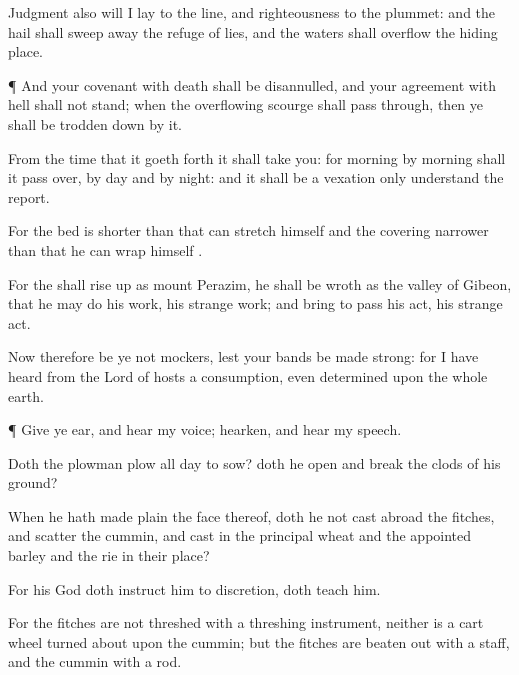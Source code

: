 {Judgment also will I
lay to the
line, and
righteousness to the
plummet: and the
hail shall sweep
away the
refuge of
lies, and the
waters shall
overflow the hiding
place.


\par }{\PP {}¶ And your
covenant with
death shall be
disannulled, and your
agreement with
hell shall not
stand; when the
overflowing
scourge shall pass
through, then ye shall be trodden
down by it.

From the
time that it goeth
forth it shall
take you: for
morning by
morning shall it pass
over, by
day and by
night: and it shall be a
vexation only
{}
understand the
report.

For the
bed is
shorter than that
{} can
stretch himself
{} and the
covering
narrower than that he can
wrap himself
{}.

For the
{} shall rise
up as
{}
mount
Perazim, he shall be
wroth as
{} the
valley of
Gibeon, that he may
do his
work, his
strange
work; and bring to
pass his
act, his
strange
act.

Now therefore be ye not
mockers, lest your
bands be made
strong: for I have
heard from the
Lord
{} of
hosts a
consumption, even
determined upon the whole
earth.


\par }{\PP {}¶ Give ye
ear, and
hear my
voice;
hearken, and
hear my
speech.

Doth the
plowman
plow all
day to
sow? doth he
open and break the
clods of his
ground?

When he hath made
plain the
face thereof, doth he not cast
abroad the
fitches, and
scatter the
cummin, and
cast in the
principal
wheat and the
appointed
barley and the
rie in their
place?

For his
God doth
instruct him to
discretion,
{} doth
teach him.

For the
fitches are not
threshed with a threshing
instrument, neither is a
cart
wheel turned
about upon the
cummin; but the
fitches are beaten
out with a
staff, and the
cummin with a
rod.

}
